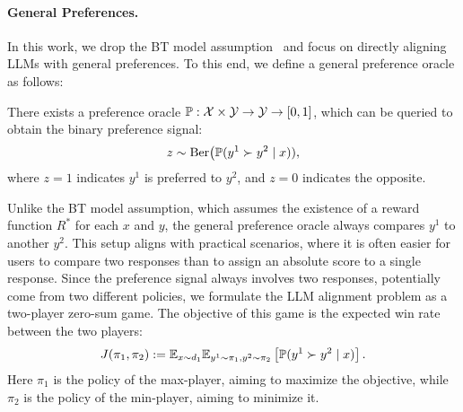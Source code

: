 \paragraph{General Preferences.} In this work, we drop the BT model assumption~\citep{bradley1952rank} and focus on directly aligning LLMs with general preferences. To this end, we define a general preference oracle as follows:
\begin{definition} \label{def:general_oracle} There exists a preference oracle $\P: \Xcal \times \Ycal \to \Ycal \rightarrow [0,1]$, which can be queried to obtain the binary preference signal:
$$
z \sim \mathrm{Ber}\big(\P(y^1 \succ y^2 \mid x)),
$$
where $z=1$ indicates $y^1$ is preferred to $y^2$, and $z = 0$ indicates the opposite.
\end{definition}
Unlike the BT model assumption, which assumes the existence of a reward function $R^*$ for each $x$ and $y$, the general preference oracle always compares $y^1$ to another $y^2$. This setup aligns with practical scenarios, where it is often easier for users to compare two responses than to assign an absolute score to a single response. Since the preference signal always involves two responses, potentially come from two different policies, we formulate the LLM alignment problem as a two-player zero-sum game. The objective of this game is the expected win rate between the two players:
\begin{align*}
J(\pi_1,\pi_2):=\E_{x \sim d_1}\E_{y^1 \sim \pi_1,y^2 \sim \pi_2}\bra{\mathbb{P}(y^1 \succ y^2 \mid x)}.
\end{align*}
Here $\pi_1$ is the policy of the max-player, aiming to maximize the objective, while $\pi_2$ is the policy of the min-player, aiming to minimize it.



